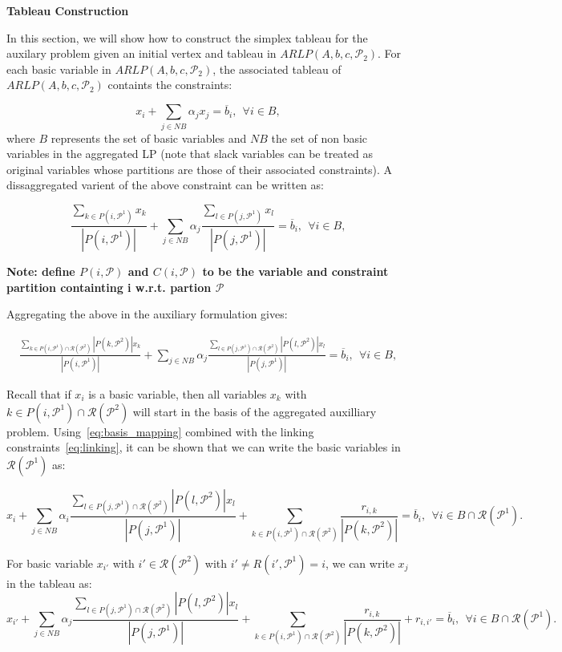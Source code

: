 \documentclass[runningheads]{llncs}
\newcommand{\cP}{{\mathcal P}}
\newcommand{\cR}{{\mathcal R}}
\begin{document}
 {\bf Tableau Construction}
 
 In this section, we will show how to construct the simplex tableau for the auxilary problem given an initial vertex and tableau in $ARLP(A,b,c,\cP_2)$. For each basic variable in $ARLP(A,b,c,\cP_2)$, the associated tableau of $ARLP(A,b,c,\cP_2)$ containts the constraints:
 
 $$x_i + \sum_{j \in NB} \alpha_j x_j  = \overline{b}_i, \ \ \forall i \in B,$$
 \noindent where $B$ represents the set of basic variables and $NB$ the set of non basic variables in the aggregated LP (note that slack variables can be treated as original variables whose partitions are those of their associated constraints). A dissaggregated varient of the above constraint can be written as:
 
 $$\frac{\sum_{k \in P(i,\cP^1) }x_k}{|P(i,\cP^1)|}
 	 + \sum_{j \in NB} \alpha_j \frac{\sum_{l \in P(j,\cP^1) }x_l }{|P(j,\cP^1)|}  = \overline{b}_i, \ \ \forall i \in B,$$
 
 {\bf Note: define $P(i,\cP)$ and $C(i,\cP)$ to be the variable and constraint partition containting i w.r.t. partion $\cP$}

Aggregating the above in the auxiliary formulation gives:


\begin{align}
\frac{\sum_{k \in P(i,\cP^1) \cap \cR(\cP^2) } |P(k,\cP^2)|x_k}{|P(i,\cP^1)|}
+ \sum_{j \in NB} \alpha_j \frac{\sum_{l \in P(j,\cP^1) \cap \cR(\cP^2) } |P(l,\cP^2)|x_l }{|P(j,\cP^1)|} 
 = \overline{b}_i, \ \ \forall i \in B, \label{eq:basis_mapping}
\end{align}

Recall that if $x_i$ is a basic variable, then all variables $x_k$ with $k \in P(i,\cP^1) \cap \cR(\cP^2)$ will start in the basis of the aggregated auxilliary problem. Using~\eqref{eq:basis_mapping} combined with the linking constraints~\eqref{eq:linking}, it can be shown that we can write the basic variables in $\cR(\cP^1)$ as:

$$x_i + \sum_{j \in NB} \alpha_i \frac{\sum_{l \in P(j,\cP^1) \cap \cR(\cP^2) } |P(l,\cP^2)|x_l }{|P(j,\cP^1)|}  + \sum_{k \in P(i,\cP^1) \cap \cR(\cP^2)} \frac {r_{i,k} } {|P(k,\cP^2)|} = \overline{b}_i, \ \ \forall i \in B\cap \cR(\cP^1).$$

For basic variable $x_{i'}$ with $i'\in \cR(\cP^2)$ with $i' \neq R(i',\cP^1) = i$, we can write $x_j$ in the tableau as: 
$$x_{i'} + \sum_{j \in NB} \alpha_j \frac{\sum_{l \in P(j,\cP^1) \cap \cR(\cP^2) } |P(l,\cP^2)|x_l }{|P(j,\cP^1)|}  + \sum_{k \in P(i,\cP^1) \cap \cR(\cP^2)} \frac {r_{i,k} } {|P(k,\cP^2)|}  + r_{i,i'}= \overline{b}_i, \ \ \forall i \in B\cap \cR(\cP^1).$$
\end{document}
